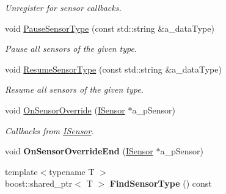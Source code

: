 \begin{DoxyCompactItemize}
\begin{DoxyCompactList}\small\item\em Unregister for sensor callbacks. \end{DoxyCompactList}\item 
\mbox{\label{class_sensor_manager_afae256a237fffc86cbf91239a430823f}} 
void \hyperlink{class_sensor_manager_afae256a237fffc86cbf91239a430823f}{Pause\+Sensor\+Type} (const std\+::string \&a\+\_\+data\+Type)
\begin{DoxyCompactList}\small\item\em Pause all sensors of the given type. \end{DoxyCompactList}\item 
\mbox{\label{class_sensor_manager_a598c08b51a852266857d9e546bd64f90}} 
void \hyperlink{class_sensor_manager_a598c08b51a852266857d9e546bd64f90}{Resume\+Sensor\+Type} (const std\+::string \&a\+\_\+data\+Type)
\begin{DoxyCompactList}\small\item\em Resume all sensors of the given type. \end{DoxyCompactList}\item 
\mbox{\label{class_sensor_manager_aeffa1ce070caf751a12e84b1b5a9768a}} 
void \hyperlink{class_sensor_manager_aeffa1ce070caf751a12e84b1b5a9768a}{On\+Sensor\+Override} (\hyperlink{class_i_sensor}{I\+Sensor} $\ast$a\+\_\+p\+Sensor)
\begin{DoxyCompactList}\small\item\em Callbacks from \hyperlink{class_i_sensor}{I\+Sensor}. \end{DoxyCompactList}\item 
\mbox{\label{class_sensor_manager_ab63ca4ca24b995e0ab06be9b59bf4428}} 
void {\bfseries On\+Sensor\+Override\+End} (\hyperlink{class_i_sensor}{I\+Sensor} $\ast$a\+\_\+p\+Sensor)
\item 
\mbox{\label{class_sensor_manager_ad38b06d4613062dd72a3acf1ff0af6e0}} 
{\footnotesize template$<$typename T $>$ }\\boost\+::shared\+\_\+ptr$<$ T $>$ {\bfseries Find\+Sensor\+Type} () const
\item 
\mbox{\label{class_sensor_manager_a98470733532d22579714e118176dd855}} 

\end{DoxyCompactItemize}
